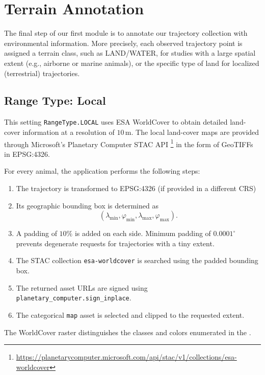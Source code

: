 \section{Terrain Annotation}
\label{sec:terrain-annotation}
The final step of our first module is to annotate our trajectory collection with environmental information.
More precisely, each observed trajectory point is assigned a terrain class, such as LAND/WATER, for studies with a large spatial extent (e.g., airborne or marine animals),
or the specific type of land for localized (terrestrial) trajectories.

\subsection{Range Type: Local}
\label{subsec:range-local}
This setting \texttt{RangeType.LOCAL} uses ESA WorldCover to obtain detailed land-cover information at a resolution of $10\,\mathrm{m}$.
The local land-cover maps are provided through Microsoft's Planetary Computer STAC API
\footnote{\url{https://planetarycomputer.microsoft.com/api/stac/v1/collections/esa-worldcover}}
in the form of GeoTIFFs in EPSG:4326.

For every animal, the application performs the following steps:
\begin{enumerate}
    \item The trajectory is transformed to EPSG:4326 (if provided in a different CRS)
    \item Its geographic bounding box is determined as
    \[
        (\lambda_{\min},\varphi_{\min},
        \lambda_{\max},\varphi_{\max}).
    \]
    \item A padding of $10\%$ is added on each side.
    Minimum padding of $0.0001^\circ$ prevents degenerate requests for trajectories with a tiny extent.
    \item The STAC collection \texttt{esa-worldcover} is searched using the padded bounding box.
    \item The returned asset URLs are signed using \texttt{planetary\_computer.sign\_inplace}.
    \item The categorical \texttt{map} asset is selected and clipped to the requested extent.
\end{enumerate}

The WorldCover raster distinguishes the classes and colors enumerated in the .

